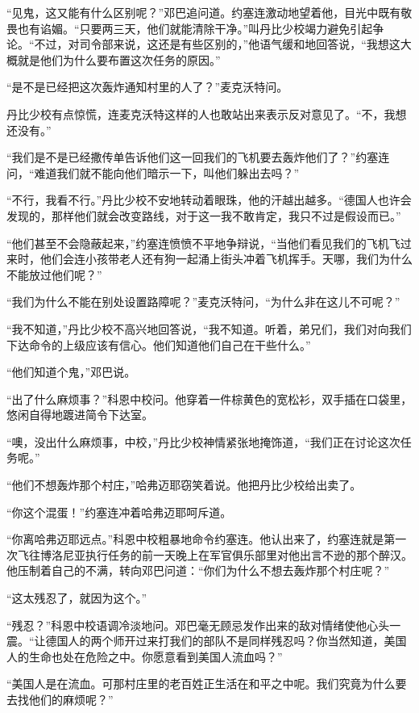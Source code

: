     “见鬼，这又能有什么区别呢？”邓巴追问道。约塞连激动地望着他，目光中既有敬畏也有谄媚。“只要两三天，他们就能清除干净。”叫丹比少校竭力避免引起争论。“不过，对司令部来说，这还是有些区别的，”他语气缓和地回答说，“我想这大概就是他们为什么要布置这次任务的原因。”

    “是不是已经把这次轰炸通知村里的人了？”麦克沃特问。

    丹比少校有点惊慌，连麦克沃特这样的人也敢站出来表示反对意见了。“不，我想还没有。”

    “我们是不是已经撒传单告诉他们这一回我们的飞机要去轰炸他们了？”约塞连问，“难道我们就不能向他们暗示一下，叫他们躲出去吗？”

    “不行，我看不行。”丹比少校不安地转动着眼珠，他的汗越出越多。“德国人也许会发现的，那样他们就会改变路线，对于这一我不敢肯定，我只不过是假设而已。”
 


    “他们甚至不会隐蔽起来，”约塞连愤愤不平地争辩说，“当他们看见我们的飞机飞过来时，他们会连小孩带老人还有狗一起涌上街头冲着飞机挥手。天哪，我们为什么不能放过他们呢？”

    “我们为什么不能在别处设置路障呢？”麦克沃特问，“为什么非在这儿不可呢？”

    “我不知道，”丹比少校不高兴地回答说，“我不知道。听着，弟兄们，我们对向我们下达命令的上级应该有信心。他们知道他们自己在干些什么。”

    “他们知道个鬼，”邓巴说。

    “出了什么麻烦事？”科恩中校问。他穿着一件棕黄色的宽松衫，双手插在口袋里，悠闲自得地踱进简令下达室。

    “噢，没出什么麻烦事，中校，”丹比少校神情紧张地掩饰道，“我们正在讨论这次任务呢。”

    “他们不想轰炸那个村庄，”哈弗迈耶窃笑着说。他把丹比少校给出卖了。

    “你这个混蛋！”约塞连冲着哈弗迈耶呵斥道。

    “你离哈弗迈耶远点。”科恩中校粗暴地命令约塞连。他认出来了，约塞连就是第一次飞往博洛尼亚执行任务的前一天晚上在军官俱乐部里对他出言不逊的那个醉汉。他压制着自己的不满，转向邓巴问道：“你们为什么不想去轰炸那个村庄呢？”

    “这太残忍了，就因为这个。”

    “残忍？”科恩中校语调冷淡地问。邓巴毫无顾忌发作出来的敌对情绪使他心头一震。“让德国人的两个师开过来打我们的部队不是同样残忍吗？你当然知道，美国人的生命也处在危险之中。你愿意看到美国人流血吗？”

    “美国人是在流血。可那村庄里的老百姓正生活在和平之中呢。我们究竟为什么要去找他们的麻烦呢？”


